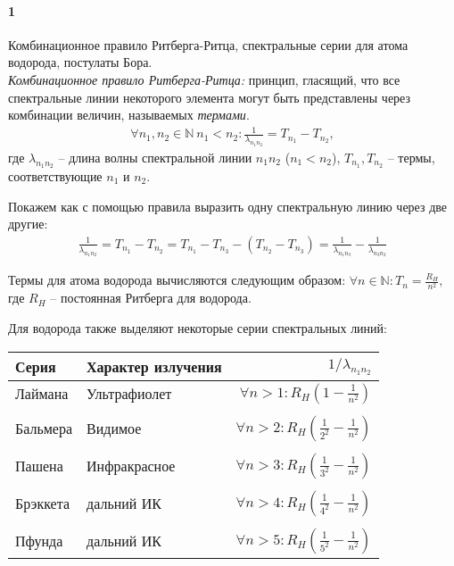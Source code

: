 



\paragraph{1}
Комбинационное правило Ритберга-Ритца, спектральные серии для атома водорода, постулаты Бора.\\

\textit{Комбинационное правило Ритберга-Ритца:} принцип, гласящий, что все спектральные линии некоторого элемента могут быть представлены через комбинации величин, называемых \textit{термами}.
\begin{gather*}
\forall n_1,n_2\in\mathbb{N} \ n_1 < n_2 \colon \frac{1}{\lambda_{n_1 n_2}} = T_{n_1} - T_{n_2},
\end{gather*}
где $\lambda_{n_1 n_2}$ -- длина волны спектральной линии $n_1 n_2$ ($n_1<n_2$), $T_{n_1}, T_{n_2}$ -- термы, соответствующие $n_1$ и $n_2$.

Покажем как с помощью правила выразить одну спектральную линию через две другие:
\begin{gather*}
\frac{1}{\lambda_{n_1 n_2}}
=
T_{n_1} - T_{n_2}
=
T_{n_1}-T_{n_3} - (T_{n_2}-T_{n_3})
=
\frac{1}{\lambda_{n_1 n_3}} - \frac{1}{\lambda_{n_3 n_2}}
\end{gather*}

Термы для атома водорода вычисляются следующим образом:
$
\forall n\in\mathbb{N}\colon T_n = \frac{R_H}{n^2},
$
где $R_H$ -- постоянная Ритберга для водорода.

Для водорода также выделяют некоторые серии спектральных линий:\\
\begin{table}[h]
\centering
\begin{tabular}{llr}
\toprule
Серия & Характер излучения & $1/\lambda_{n_1 n_2}$ \\
\midrule
Лаймана & Ультрафиолет & $\forall n>1\colon R_{H}\left(1-\frac{1}{n^2}\right)$ \\
& & \\
Бальмера & Видимое & $\forall n>2\colon R_{H}\left(\frac{1}{2^2}-\frac{1}{n^2}\right)$ \\
& & \\
Пашена & Инфракрасное & $\forall n>3\colon R_{H}\left(\frac{1}{3^2}-\frac{1}{n^2}\right)$ \\
& & \\
Брэккета & дальний ИК & $\forall n>4\colon R_{H}\left(\frac{1}{4^2}-\frac{1}{n^2}\right)$ \\
& & \\
Пфунда & дальний ИК & $\forall n>5\colon R_{H}\left(\frac{1}{5^2}-\frac{1}{n^2}\right)$ \\
\bottomrule
\end{tabular}
\end{table}

